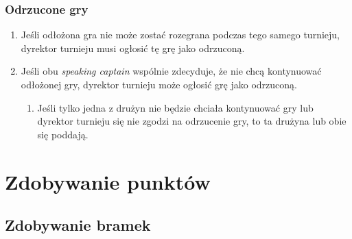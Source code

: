 \documentclass[11pt,a4paper]{article}
\begin{document}
\subsubsection{Odrzucone gry}
\begin{enumerate}
  \item Jeśli odłożona gra nie może zostać rozegrana podczas tego samego turnieju, dyrektor turnieju musi ogłosić tę grę jako odrzuconą.
  \item Jeśli obu \emph{speaking captain} wspólnie zdecyduje, że nie chcą kontynuować odłożonej gry, dyrektor turnieju może ogłosić grę jako odrzuconą.
  \begin{enumerate}
    \item Jeśli tylko jedna z drużyn nie będzie chciała kontynuować gry lub dyrektor turnieju się nie zgodzi na odrzucenie gry, to ta drużyna lub obie się poddają.
  \end{enumerate}
\end{enumerate}

\section{Zdobywanie punktów}

\subsection{Zdobywanie bramek}
\end{document}
